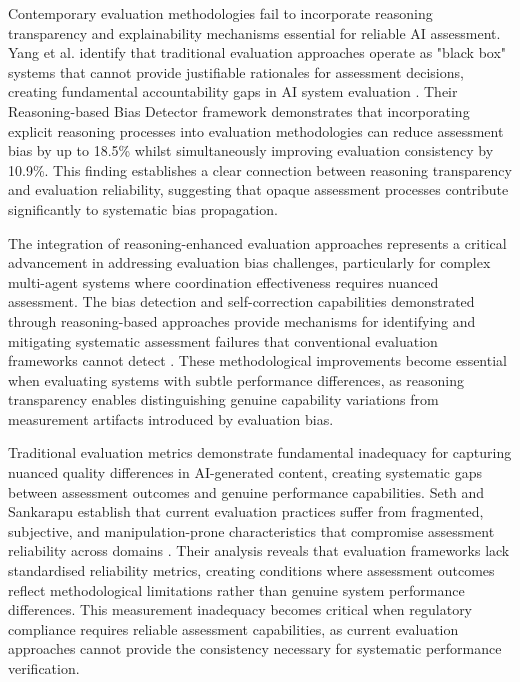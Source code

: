 Contemporary evaluation methodologies fail to incorporate reasoning transparency and explainability mechanisms essential for reliable AI assessment. Yang et al. identify that traditional evaluation approaches operate as "black box" systems that cannot provide justifiable rationales for assessment decisions, creating fundamental accountability gaps in AI system evaluation \cite{yang2025reasoning_bias_detector}. Their Reasoning-based Bias Detector framework demonstrates that incorporating explicit reasoning processes into evaluation methodologies can reduce assessment bias by up to 18.5\% whilst simultaneously improving evaluation consistency by 10.9\%. This finding establishes a clear connection between reasoning transparency and evaluation reliability, suggesting that opaque assessment processes contribute significantly to systematic bias propagation.

The integration of reasoning-enhanced evaluation approaches represents a critical advancement in addressing evaluation bias challenges, particularly for complex multi-agent systems where coordination effectiveness requires nuanced assessment. The bias detection and self-correction capabilities demonstrated through reasoning-based approaches provide mechanisms for identifying and mitigating systematic assessment failures that conventional evaluation frameworks cannot detect \cite{yang2025reasoning_bias_detector}. These methodological improvements become essential when evaluating systems with subtle performance differences, as reasoning transparency enables distinguishing genuine capability variations from measurement artifacts introduced by evaluation bias.

Traditional evaluation metrics demonstrate fundamental inadequacy for capturing nuanced quality differences in AI-generated content, creating systematic gaps between assessment outcomes and genuine performance capabilities. Seth and Sankarapu establish that current evaluation practices suffer from fragmented, subjective, and manipulation-prone characteristics that compromise assessment reliability across domains \cite{seth2025xai_metrics_gap}. Their analysis reveals that evaluation frameworks lack standardised reliability metrics, creating conditions where assessment outcomes reflect methodological limitations rather than genuine system performance differences. This measurement inadequacy becomes critical when regulatory compliance requires reliable assessment capabilities, as current evaluation approaches cannot provide the consistency necessary for systematic performance verification.


